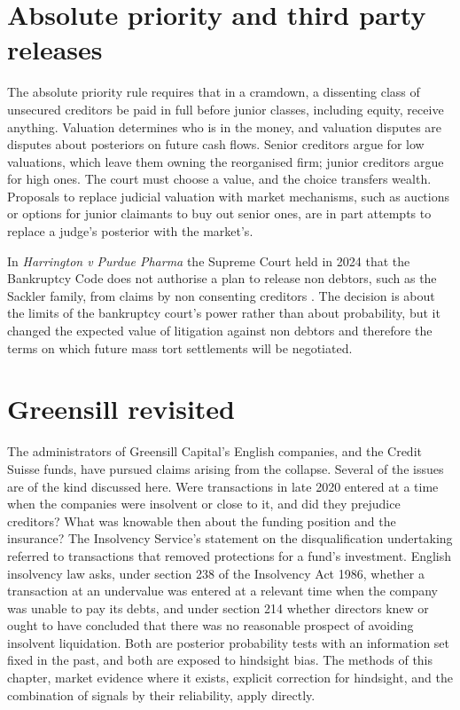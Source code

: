 \section{Absolute priority and third party releases}

The absolute priority rule requires that in a cramdown, a dissenting class of unsecured creditors be paid in full before junior classes, including equity, receive anything. Valuation determines who is in the money, and valuation disputes are disputes about posteriors on future cash flows. Senior creditors argue for low valuations, which leave them owning the reorganised firm; junior creditors argue for high ones. The court must choose a value, and the choice transfers wealth. Proposals to replace judicial valuation with market mechanisms, such as auctions or options for junior claimants to buy out senior ones, are in part attempts to replace a judge's posterior with the market's.

In \emph{Harrington v Purdue Pharma} the Supreme Court held in 2024 that the Bankruptcy Code does not authorise a plan to release non debtors, such as the Sackler family, from claims by non consenting creditors \citep{purdue2024}. The decision is about the limits of the bankruptcy court's power rather than about probability, but it changed the expected value of litigation against non debtors and therefore the terms on which future mass tort settlements will be negotiated.

\section{Greensill revisited}

The administrators of Greensill Capital's English companies, and the Credit Suisse funds, have pursued claims arising from the collapse. Several of the issues are of the kind discussed here. Were transactions in late 2020 entered at a time when the companies were insolvent or close to it, and did they prejudice creditors? What was knowable then about the funding position and the insurance? The Insolvency Service's statement on the disqualification undertaking referred to transactions that removed protections for a fund's investment. English insolvency law asks, under section 238 of the Insolvency Act 1986, whether a transaction at an undervalue was entered at a relevant time when the company was unable to pay its debts, and under section 214 whether directors knew or ought to have concluded that there was no reasonable prospect of avoiding insolvent liquidation. Both are posterior probability tests with an information set fixed in the past, and both are exposed to hindsight bias. The methods of this chapter, market evidence where it exists, explicit correction for hindsight, and the combination of signals by their reliability, apply directly.

